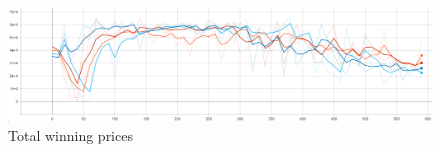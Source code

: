\begin{figure}[H]
    \centering
    \includegraphics[width=\linewidth]{figures/5_evaluation_figs/net_arch_training_fig/total_winning_prices.png}
    \caption{Total winning prices}
    \label{fig:net_arch_total_winning_prices}
\end{figure}

